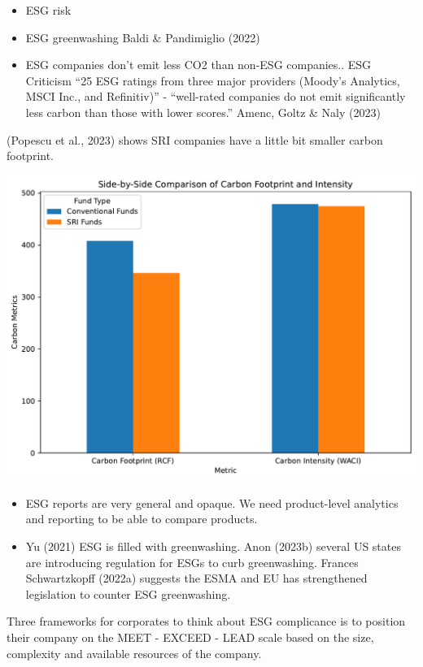 \documentclass[
  letterpaper,
  DIV=11,
  numbers=noendperiod]{scrartcl}
\begin{document}
\begin{itemize}
\item
  ESG risk
\item
  ESG greenwashing Baldi \& Pandimiglio (2022)
\item
  ESG companies don't emit less CO2 than non-ESG companies.. ESG
  Criticism ``25 ESG ratings from three major providers (Moody's
  Analytics, MSCI Inc., and Refinitiv)'' - ``well-rated companies do not
  emit significantly less carbon than those with lower scores.'' Amenc,
  Goltz \& Naly (2023)
\end{itemize}

(Popescu et al., 2023) shows SRI companies have a little bit smaller
carbon footprint.

\includegraphics{_thesis_files/figure-pdf/cell-55-output-1.pdf}

\begin{itemize}
\item
  ESG reports are very general and opaque. We need product-level
  analytics and reporting to be able to compare products.
\item
  Yu (2021) ESG is filled with greenwashing. Anon (2023b) several US
  states are introducing regulation for ESGs to curb greenwashing.
  Frances Schwartzkopff (2022a) suggests the ESMA and EU has
  strengthened legislation to counter ESG greenwashing.
\end{itemize}

Three frameworks for corporates to think about ESG complicance is to
position their company on the MEET - EXCEED - LEAD scale based on the
size, complexity and available resources of the company.
\end{document}
